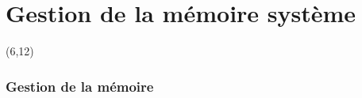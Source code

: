 %
%
%

\part{Gestion de la mémoire système}

{
\begin{frame}[plain]
  \partpage
  \begin{textblock}{10}(6,12)
    \begin{quote}
      \rmfamily\textit\textbf\color{darkgray}{\large
      ``It's not a bug, its a feature.''}
    \end{quote}
  \end{textblock}
\end{frame}
}

\begin{frame}
\tableofcontents
\end{frame}


\section{Gestion de la mémoire}

